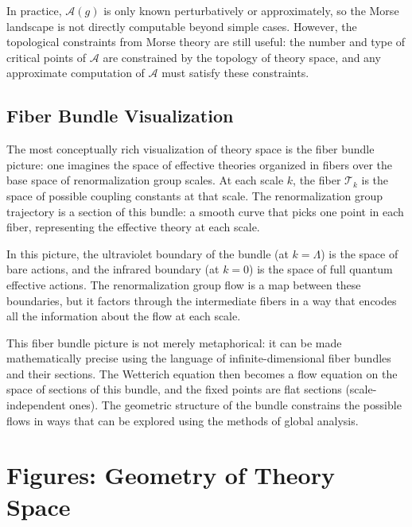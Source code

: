 \documentclass[11pt, twoside, openright]{book}
\theoremstyle{dotted}
\theoremstyle{definition}
\newcommand{\cT}{\mathcal{T}}          %
\begin{document}
In practice, $\mathcal{A}(g)$ is only known perturbatively or approximately, so
the Morse landscape is not directly computable beyond simple cases. However, the
topological constraints from Morse theory are still useful: the number and type
of critical points of $\mathcal{A}$ are constrained by the topology of theory
space, and any approximate computation of $\mathcal{A}$ must satisfy these
constraints.

\section{Fiber Bundle Visualization}

The most conceptually rich visualization of theory space is the fiber bundle
picture: one imagines the space of effective theories organized in fibers over
the base space of renormalization group scales. At each scale $k$, the fiber
$\cT_k$ is the space of possible coupling constants at that scale. The
renormalization group trajectory is a section of this bundle: a smooth curve that
picks one point in each fiber, representing the effective theory at each scale.

In this picture, the ultraviolet boundary of the bundle (at $k = \Lambda$) is the
space of bare actions, and the infrared boundary (at $k = 0$) is the space of full
quantum effective actions. The renormalization group flow is a map between these
boundaries, but it factors through the intermediate fibers in a way that encodes
all the information about the flow at each scale.

This fiber bundle picture is not merely metaphorical: it can be made mathematically
precise using the language of infinite-dimensional fiber bundles and their sections.
The Wetterich equation then becomes a flow equation on the space of sections of
this bundle, and the fixed points are flat sections (scale-independent ones). The
geometric structure of the bundle constrains the possible flows in ways that can
be explored using the methods of global analysis.


\chapter{Figures: Geometry of Theory Space}
\label{ch:figures}
\end{document}
